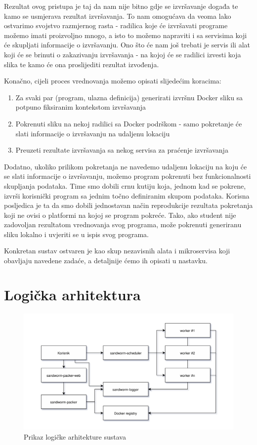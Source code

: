\documentclass[times, utf8, zavrsni]{fer}
\begin{document}
Rezultat ovog pristupa je taj da nam nije bitno gdje se izvršavanje događa te kamo se usmjerava rezultat izvršavanja. To nam omogućava da veoma lako ostvarimo svojstvo razmjernog rasta - radilica koje će izvršavati programe možemo imati proizvoljno mnogo, a isto to možemo napraviti i sa servisima koji će skupljati informacije o izvršavanju. Ono što će nam još trebati je servis ili alat koji će se brinuti o zakazivanju izvršavanja - na kojoj će se radilici izvesti koja slika te kamo će ona proslijediti rezultat izvođenja.

Konačno, cijeli proces vrednovanja možemo opisati slijedećim koracima:

\begin{enumerate}
\item Za svaki par (program, ulazna definicija) generirati izvršnu Docker sliku sa potpuno fiksiranim kontekstom izvršavanja
\item Pokrenuti sliku na nekoj radilici sa Docker podrškom - samo pokretanje će slati informacije o izvršavanju na udaljenu lokaciju
\item Preuzeti rezultate izvršavanja sa nekog servisa za praćenje izvršavanja
\end{enumerate}

Dodatno, ukoliko prilikom pokretanja ne navedemo udaljenu lokaciju na koju će se slati informacije o izvršavanju, možemo program pokrenuti bez funkcionalnosti skupljanja podataka. Time smo dobili crnu kutiju koja, jednom kad se pokrene, izvrši korisnički program sa jednim točno definiranim skupom podataka. Korisna posljedica je ta da smo dobili jednostavan način reprodukcije rezultata pokretanja koji ne ovisi o platformi na kojoj se program pokreće. Tako, ako student nije zadovoljan rezultatom vrednovanja svog programa, može pokrenuti generiranu sliku lokalno i uvjeriti se u ispis svog programa.

Konkretan sustav ostvaren je kao skup nezavisnih alata i mikroservisa koji obavljaju navedene zadaće, a detaljnije ćemo ih opisati u nastavku.

\section{Logička arhitektura}

\begin{figure}[H]
	\centering
	\includegraphics[width=\textwidth]{sandworm-schema.png}
	\caption{Prikaz logičke arhitekture sustava}
\end{figure}
\end{document}
